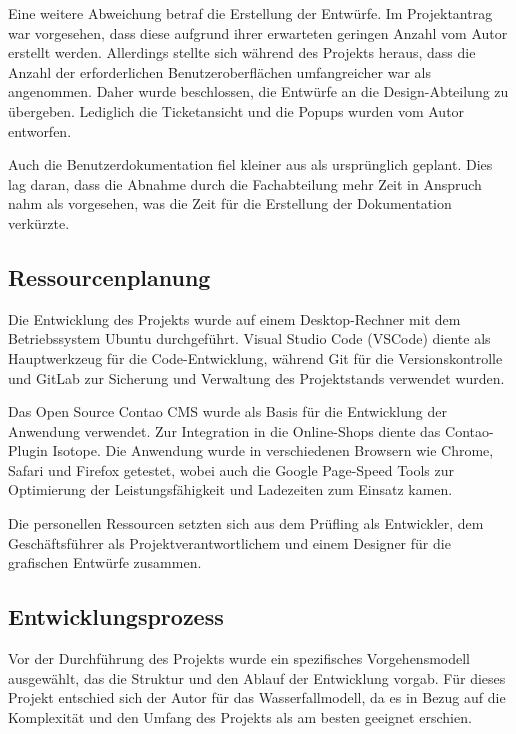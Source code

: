 Eine weitere Abweichung betraf die Erstellung der Entwürfe. Im Projektantrag war vorgesehen, dass diese aufgrund ihrer erwarteten geringen Anzahl vom Autor erstellt werden. Allerdings stellte sich während des Projekts heraus, dass die Anzahl der erforderlichen Benutzeroberflächen umfangreicher war als angenommen. Daher wurde beschlossen, die Entwürfe an die Design-Abteilung zu übergeben. Lediglich die Ticketansicht und die Popups wurden vom Autor entworfen.

Auch die Benutzerdokumentation fiel kleiner aus als ursprünglich geplant. Dies lag daran, dass die Abnahme durch die Fachabteilung mehr Zeit in Anspruch nahm als vorgesehen, was die Zeit für die Erstellung der Dokumentation verkürzte.

\subsection{Ressourcenplanung}
\label{sec:Ressourcenplanung}

Die Entwicklung des Projekts wurde auf einem Desktop-Rechner mit dem Betriebssystem Ubuntu durchgeführt. Visual Studio Code (VSCode) diente als Hauptwerkzeug für die Code-Entwicklung, während Git für die Versionskontrolle und GitLab zur Sicherung und Verwaltung des Projektstands verwendet wurden.

Das Open Source Contao CMS wurde als Basis für die Entwicklung der Anwendung verwendet. Zur Integration in die Online-Shops diente das Contao-Plugin Isotope. Die Anwendung wurde in verschiedenen Browsern wie Chrome, Safari und Firefox getestet, wobei auch die Google Page-Speed Tools zur Optimierung der Leistungsfähigkeit und Ladezeiten zum Einsatz kamen.

Die personellen Ressourcen setzten sich aus dem Prüfling als Entwickler, dem Geschäftsführer als Projektverantwortlichem und einem Designer für die grafischen Entwürfe zusammen.
\paragraph{}

\subsection{Entwicklungsprozess}
\label{sec:Entwicklungsprozess}

Vor der Durchführung des Projekts wurde ein spezifisches Vorgehensmodell ausgewählt, das die Struktur und den Ablauf der Entwicklung vorgab. Für dieses Projekt entschied sich der Autor für das Wasserfallmodell, da es in Bezug auf die Komplexität und den Umfang des Projekts als am besten geeignet erschien.

